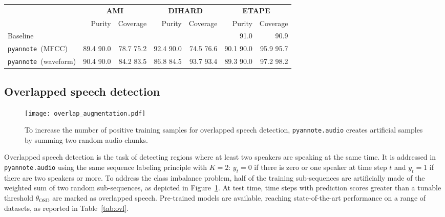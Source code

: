 \documentclass{article}
\def\pyannote{{\small\texttt{pyannote}}}
\begin{document}
\begin{table*}[]
    \centering
    \begin{tabular}{|l|r|r|r|r|r|r|}
        \hline
        & \multicolumn{2}{c|}{\textbf{AMI}} & \multicolumn{2}{c|}{\textbf{DIHARD}} & \multicolumn{2}{c|}{\textbf{ETAPE}} \\
        & Purity & Coverage & Purity & Coverage & Purity & Coverage \\
        \hline
        Baseline &  &  &  &  & {\scriptsize{91.0}} \cite{Yin2017} & {\scriptsize{90.9}} \cite{Yin2017}\\
        \hline
        \pyannote~(MFCC)    & 89.4 \scriptsize{90.0} & 78.7 \scriptsize{75.2} & 92.4 \scriptsize{90.0} &  74.5 \scriptsize{76.6} & 90.1 \scriptsize{90.0} & 95.9 \scriptsize{95.7}   \\
        \pyannote~(waveform) & 90.4 \scriptsize{90.0} & 84.2 \scriptsize{83.5} & 86.8 \scriptsize{84.5} & 93.7 \scriptsize{93.4} & 89.3 \scriptsize{90.0} & 97.2 \scriptsize{98.2}  \\
        \hline

    \end{tabular}
    \caption{Evaluation of pre-trained speaker change detection models, in terms of speech turn coverage (\%) and purity (\%). Results on the development set are reported using small font size. We report two {\small{\texttt{pyannote.audio}}} variants: the first one is based on handcrafted features (MFCCs) and the other one is an end-to-end model processing the waveform directly.
\emph{Baseline} corresponds to the best result we could find in the literature as of October 2019.}
    \label{tab:scd}
\end{table*}

\vspace{-0.17cm}
\subsection{Overlapped speech detection}
\label{ssec:ovl}

\begin{figure}
    \centering
    \texttt{[image: overlap\_augmentation.pdf]}
    \caption{To increase the number of positive training samples for overlapped speech detection, {\small \texttt{pyannote.audio}} creates artificial samples by summing two random audio chunks.}
    \label{fig:ovl}
\end{figure}

Overlapped speech detection is the task of detecting regions where at least two speakers are speaking at the same time. It is addressed in {\small\texttt{pyannote.audio}} using the same sequence labeling principle with $K=2$: $y_{t} = 0$ if there is zero or one speaker at time step $t$ and $y_t = 1$ if there are two speakers or more. To address the class imbalance problem, half of the training sub-sequences are artificially made of the weighted sum of two random sub-sequences, as depicted in Figure~\ref{fig:ovl}. At test time, time steps with prediction scores greater than a tunable threshold $\theta_{\text{OSD}}$ are marked as overlapped speech. Pre-trained models are available, reaching state-of-the-art performance on a range of datasets, as reported in Table~\ref{tab:ovl}.
\end{document}
